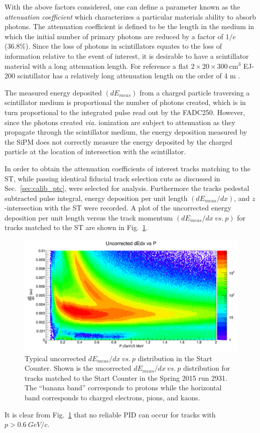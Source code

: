 With the above factors considered, one can define a parameter known as the \textit{attenuation coefficient} which characterizes a particular materials ability to absorb photons. The attenuation coefficient is defined to be the length in the medium in which the initial number of primary  photons are reduced by a factor of $1/e$ (36.8\%).  Since the loss of photons in scintillators equates to the loss of information relative to the event of interest, it is desirable to have a scintillator material with a long attenuation length.  For reference a flat $2 \times 20 \times 300\ \mathrm{cm^{3}}$ EJ-200 scintillator has a relatively long attenuation length on the order of 4 m \cite{ej200_specs}.

The measured energy deposited $(dE_{meas})$ from a charged particle traversing a scintillator medium is proportional the number of photons created, which is in turn proportional to the integrated pulse read out by the FADC250.  However, since the photons created \textit{via.} ionization are subject to attenuation as they propagate through the scintillator medium, the energy deposition measured by the SiPM does not correctly measure the energy deposited by the charged particle at the location of intersection with the scintillator.  

In order to obtain the attenuation coefficients of interest tracks matching to the ST, while passing identical fiducial track selection cuts as discussed in Sec.~\ref{sec:calib_ptc}, were selected for analysis.  Furthermore the tracks pedestal subtracted pulse integral, energy deposition per unit length $(dE_{meas} / dx)$, and $z$-intersection with the ST were recorded.  A plot of the uncorrected energy deposition per unit length versus the track momentum $(dE_{meas} / dx\ vs.\ p)$ for tracks matched to the ST are shown in Fig.~\ref{fig:dEdx_vs_p_uncorr}.
	\begin{figure}[!htb]
		\centering
		\includegraphics[width=1.0\columnwidth]{calibration/figs/dEdx_vs_p_uncorr}
		\caption{Typical uncorrected $dE_{meas}/dx\ vs.\ p$ distribution in the Start Counter.  Shown is the uncorrected $dE_{meas}/dx\ vs.\ p$ distribution for tracks matched to the Start Counter in the Spring 2015 run 2931. The ``banana band'' corresponds to protons while the horizontal band corresponds to charged electrons, pions, and kaons.}
		\label{fig:dEdx_vs_p_uncorr}
	\end{figure}
It is clear from Fig.~\ref{fig:dEdx_vs_p_uncorr} that no reliable PID can occur for tracks with $p > 0.6\ GeV/c$.

